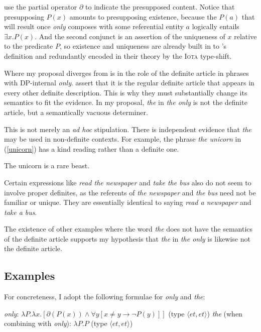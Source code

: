 \citeauthor{cb2015} use the partial operator $\partial$ to indicate the presupposed content. Notice that presupposing $P(x)$ amounts to presupposing existence, because the $P(a)$ that will result once \textit{only} composes with some referential entity $a$ logically entails $\exists x . P(x)$. And the second conjunct is an assertion of the uniqueness of $x$ relative to the predicate $P$, so existence and uniqueness are already built in to \citeauthor{cb2015}'s definition and redundantly encoded in their theory by the \textsc{Iota} type-shift.

Where my proposal diverges from  is in the role of the definite article in phrases with DP-internal \textit{only}. \citeauthor{cb2015} assert that it is the regular definite article that appears in every other definite description. This is why they must substantially change its semantics to fit the evidence. In my proposal, \textit{the} in \textit{the only} is not the definite article, but a semantically vacuous determiner.

This is not merely an \textit{ad hoc} stipulation. There is independent evidence that \textit{the} may be used in non-definite contexts. For example, the phrase \textit{the unicorn} in (\ref{unicorn}) has a kind reading rather than a definite one.

\begin{exe}
	\ex \label{unicorn} The unicorn is a rare beast.
\end{exe}

Certain expressions like \textit{read the newspaper} and \textit{take the bus} also do not seem to involve proper definites, as the referents of \textit{the newspaper} and \textit{the bus} need not be familiar or unique. They are essentially identical to saying \textit{read a newspaper} and \textit{take a bus}.

The existence of other examples where the word \textit{the} does not have the semantics of the definite article supports my hypothesis that \textit{the} in \textit{the only} is likewise not the definite article.

\subsection{Examples}
For concreteness, I adopt the following formulae for \textit{only} and \textit{the}:

\begin{exe}
	\ex \textit{only}: $ \lambda P . \lambda x . [ \partial(P(x)) \land \forall y [ x \ne y \to \neg P(y) ] ] $ (type $\langle et, et \rangle$)
	\ex \textit{the} (when combining with \textit{only}): $\lambda P . P$ (type $\langle et, et \rangle$)
\end{exe}

